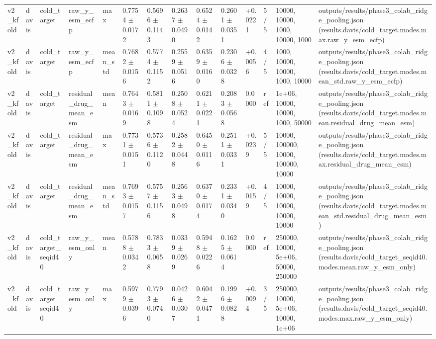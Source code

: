 \begin{table}[htbp]
\begin{tabular}{llllllllllllll}
v2\_kfold & davis & cold\_target & raw\_y\_esm\_ecfp & max & 0.7754 $\pm$ 0.0172 & 0.5696 $\pm$ 0.1143 & 0.2637 $\pm$ 0.0490 & 0.6524 $\pm$ 0.0142 & 0.2601 $\pm$ 0.0351 & +0.0221 & 5/5 & 10000, 10000, 1000, 10000, 1000 & outputs/results/phase3\_colab\_ridge\_pooling.json (results.davis/cold\_target.modes.max.raw\_y\_esm\_ecfp) \\
v2\_kfold & davis & cold\_target & raw\_y\_esm\_ecfp & mean\_std & 0.7682 $\pm$ 0.0156 & 0.5774 $\pm$ 0.1152 & 0.2559 $\pm$ 0.0516 & 0.6359 $\pm$ 0.0160 & 0.2306 $\pm$ 0.0328 & +0.0056 & 4/5 & 1000, 10000, 10000, 1000, 10000 & outputs/results/phase3\_colab\_ridge\_pooling.json (results.davis/cold\_target.modes.mean\_std.raw\_y\_esm\_ecfp) \\
v2\_kfold & davis & cold\_target & residual\_drug\_mean\_esm & mean & 0.7643 $\pm$ 0.0169 & 0.5811 $\pm$ 0.1098 & 0.2508 $\pm$ 0.0524 & 0.6211 $\pm$ 0.0221 & 0.2083 $\pm$ 0.0568 & 0.0000 & ref & 1e+06, 10000, 10000, 1000, 50000 & outputs/results/phase3\_colab\_ridge\_pooling.json (results.davis/cold\_target.modes.mean.residual\_drug\_mean\_esm) \\
v2\_kfold & davis & cold\_target & residual\_drug\_mean\_esm & max & 0.7731 $\pm$ 0.0151 & 0.5736 $\pm$ 0.1120 & 0.2582 $\pm$ 0.0448 & 0.6450 $\pm$ 0.0116 & 0.2511 $\pm$ 0.0331 & +0.0239 & 5/5 & 10000, 100000, 10000, 100000, 10000 & outputs/results/phase3\_colab\_ridge\_pooling.json (results.davis/cold\_target.modes.max.residual\_drug\_mean\_esm) \\
v2\_kfold & davis & cold\_target & residual\_drug\_mean\_esm & mean\_std & 0.7693 $\pm$ 0.0157 & 0.5757 $\pm$ 0.1156 & 0.2563 $\pm$ 0.0498 & 0.6370 $\pm$ 0.0174 & 0.2331 $\pm$ 0.0340 & +0.0159 & 4/5 & 10000, 10000, 10000, 10000, 10000 & outputs/results/phase3\_colab\_ridge\_pooling.json (results.davis/cold\_target.modes.mean\_std.residual\_drug\_mean\_esm) \\
v2\_kfold & davis & cold\_target\_seqid40 & raw\_y\_esm\_only & mean & 0.5788 $\pm$ 0.0342 & 0.7833 $\pm$ 0.0658 & 0.0339 $\pm$ 0.0269 & 0.5948 $\pm$ 0.0226 & 0.1625 $\pm$ 0.0614 & 0.0000 & ref & 250000, 10000, 5e+06, 50000, 250000 & outputs/results/phase3\_colab\_ridge\_pooling.json (results.davis/cold\_target\_seqid40.modes.mean.raw\_y\_esm\_only) \\
v2\_kfold & davis & cold\_target\_seqid40 & raw\_y\_esm\_only & max & 0.5979 $\pm$ 0.0396 & 0.7793 $\pm$ 0.0740 & 0.0426 $\pm$ 0.0307 & 0.6042 $\pm$ 0.0471 & 0.1996 $\pm$ 0.0828 & +0.0094 & 3/5 & 250000, 10000, 5e+06, 10000, 1e+06 & outputs/results/phase3\_colab\_ridge\_pooling.json (results.davis/cold\_target\_seqid40.modes.max.raw\_y\_esm\_only) \\

\end{tabular}
\end{table}
